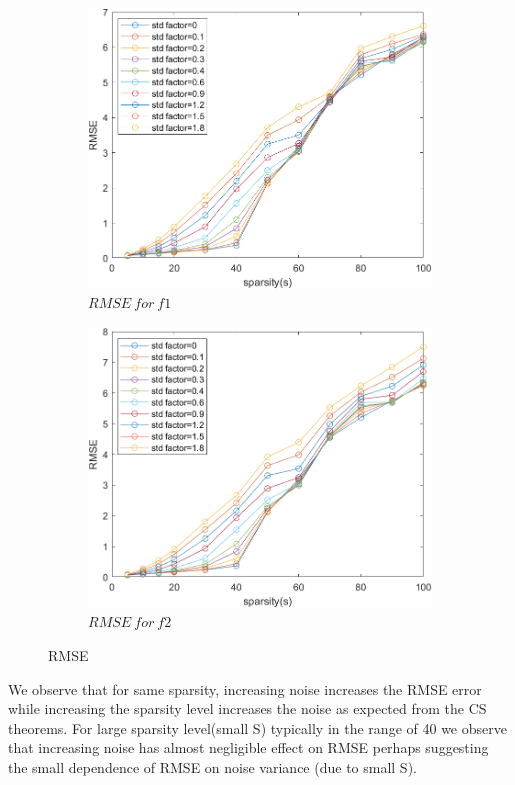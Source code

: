 \documentclass[12pt]{article}
\begin{document}
\begin{figure}[H]
     \centering
     \begin{subfigure}[b]{0.47\textwidth}
         \centering
         \includegraphics[width=\textwidth]{rmse_f1.png}
         \caption{$RMSE \ for \ f1$}
         \label{}
     \end{subfigure}
     \hfill
     \begin{subfigure}[b]{0.47\textwidth}
         \centering
         \includegraphics[width=\textwidth]{rmse_f2.png}
         \caption{$RMSE \ for \ f2$}
         \label{}
     \end{subfigure}
        \caption{RMSE}
        \label{fig:1}
\end{figure}
We observe that for same sparsity, increasing noise increases the RMSE error while increasing the sparsity level increases the noise as expected from the CS theorems. For large sparsity level(small S) typically in the range of 40 we observe that increasing noise has almost negligible effect on RMSE perhaps suggesting the small dependence of RMSE on noise variance (due to small S).
\end{document}
